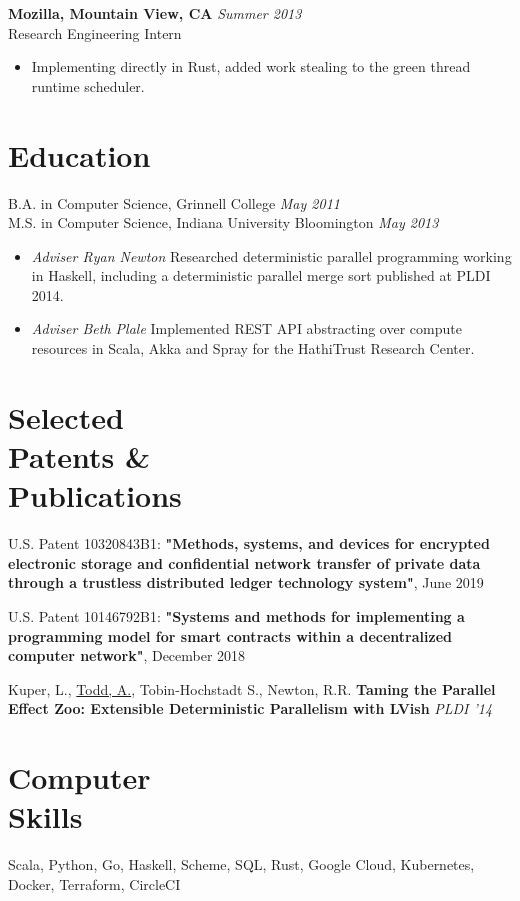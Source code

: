 \documentclass[margin]{res}
\begin{document}
\begin{resume}
 {\bf Mozilla, Mountain View, CA} \hfill \textit{Summer 2013} \\
 Research Engineering Intern
 \begin{itemize} \itemsep -2pt  %
 \item Implementing directly in Rust, added work stealing to the green thread runtime scheduler.
 \end{itemize}
 
\section{Education}
B.A. in Computer Science, Grinnell College \hfill \textit{May 2011} \\
M.S. in Computer Science, Indiana University Bloomington \hfill \textit{May 2013}
 \begin{itemize} \itemsep -2pt
 \item {\it Adviser Ryan Newton} Researched deterministic parallel programming working in Haskell, including a deterministic parallel merge sort published at PLDI 2014.
 \item {\it Adviser Beth Plale} Implemented REST API abstracting over compute resources in Scala, Akka and Spray for the HathiTrust Research Center.
 \end{itemize}
 
\section{Selected \\ Patents \& \\ Publications}

U.S. Patent 10320843B1: {\bf "Methods, systems, and devices for encrypted electronic storage and confidential network transfer of private data through a trustless distributed ledger technology system"}, June 2019

U.S. Patent 10146792B1: {\bf "Systems and methods for implementing a programming model for smart contracts within a decentralized computer network"}, December 2018

Kuper, L., \underline{Todd, A.}, Tobin-Hochstadt S., Newton, R.R. {\bf Taming the Parallel Effect Zoo: Extensible Deterministic Parallelism with LVish} \textit{PLDI '14} 

\section{Computer \\ Skills}
Scala, Python, Go, Haskell, Scheme, SQL, Rust, Google Cloud, Kubernetes, Docker, Terraform, CircleCI

\end{resume} 
\end{document}
